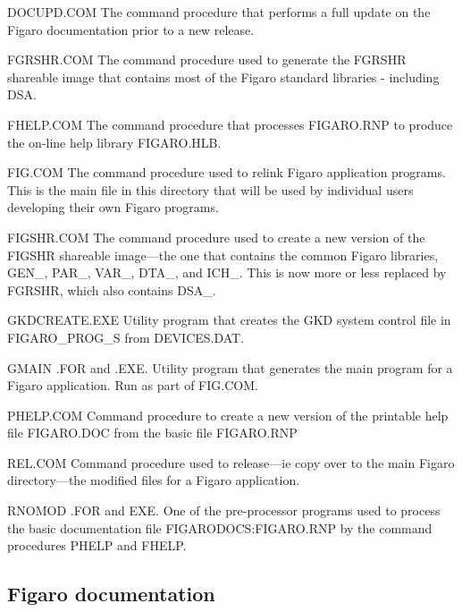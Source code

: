 \begin{description}
\item DOCUPD.COM The command procedure that performs a full update on the
Figaro documentation prior to a new release.

\item FGRSHR.COM The command procedure used to generate the FGRSHR shareable
image that contains most of the Figaro standard libraries - including DSA.

\item FHELP.COM The command procedure that  processes FIGARO.RNP to 
produce the on-line help library FIGARO.HLB.

\item FIG.COM The command procedure used to relink Figaro application
programs. This is the main file in this directory that will be used by 
individual users developing their own Figaro programs.

\item FIGSHR.COM The command procedure used to create a new version of the
FIGSHR shareable image---the one that contains the common Figaro 
libraries, GEN\_, PAR\_, VAR\_, DTA\_, and ICH\_. This is now more or
less replaced by FGRSHR, which also contains DSA\_.

\item GKDCREATE.EXE Utility program that creates the GKD system control file
in FIGARO\_\-PROG\_S from DEVICES.DAT.

\item GMAIN .FOR and .EXE. Utility program that generates the main program
for a Figaro application. Run as part of FIG.COM.

\item PHELP.COM Command procedure to create a new version of the printable
help file FIGARO.DOC from the basic file FIGARO.RNP

\item REL.COM Command procedure used to release---ie copy over to the main
Figaro directory---the modified files for a Figaro application.

\item RNOMOD .FOR and EXE. One of the pre-processor programs used to 
process the basic documentation file FIGARODOCS:FIGARO.RNP by the command
procedures PHELP and FHELP. 

\end{description} 

\subsection{Figaro documentation}


